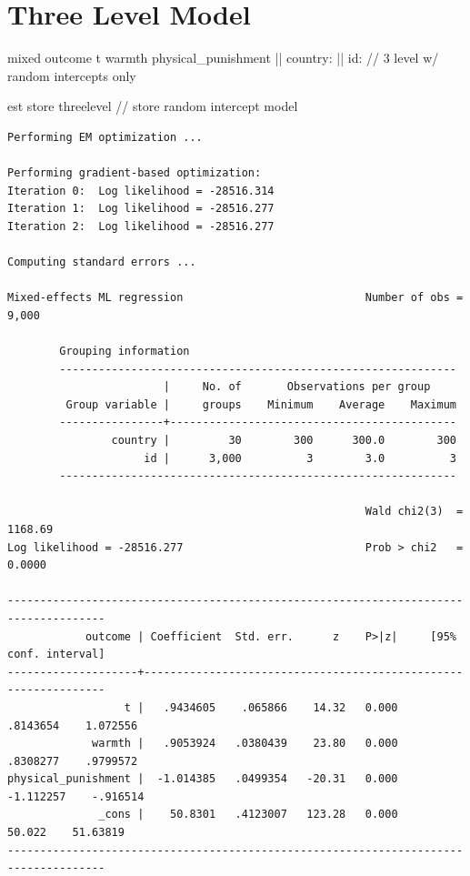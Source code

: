 \documentclass[
  letterpaper,
  DIV=11,
  numbers=noendperiod]{scrreprt}
\newenvironment{Shaded}{\begin{snugshade}}{\end{snugshade}}
\newcommand{\CommentTok}[1]{\textcolor[rgb]{0.37,0.37,0.37}{#1}}
\newcommand{\KeywordTok}[1]{\textcolor[rgb]{0.00,0.23,0.31}{#1}}
\newcommand{\NormalTok}[1]{\textcolor[rgb]{0.00,0.23,0.31}{#1}}
\begin{document}
\section{Three Level Model}\label{three-level-model}

\begin{Shaded}
\begin{Highlighting}[]

\NormalTok{mixed outcome t warmth physical\_punishment || country: || id:  }\CommentTok{// 3 level w/ random intercepts only}
    
\KeywordTok{est} \KeywordTok{store}\NormalTok{ threelevel }\CommentTok{// store random intercept model}
\end{Highlighting}
\end{Shaded}

\begin{verbatim}
Performing EM optimization ...

Performing gradient-based optimization: 
Iteration 0:  Log likelihood = -28516.314  
Iteration 1:  Log likelihood = -28516.277  
Iteration 2:  Log likelihood = -28516.277  

Computing standard errors ...

Mixed-effects ML regression                            Number of obs =   9,000

        Grouping information
        -------------------------------------------------------------
                        |     No. of       Observations per group
         Group variable |     groups    Minimum    Average    Maximum
        ----------------+--------------------------------------------
                country |         30        300      300.0        300
                     id |      3,000          3        3.0          3
        -------------------------------------------------------------

                                                       Wald chi2(3)  = 1168.69
Log likelihood = -28516.277                            Prob > chi2   =  0.0000

-------------------------------------------------------------------------------------
            outcome | Coefficient  Std. err.      z    P>|z|     [95% conf. interval]
--------------------+----------------------------------------------------------------
                  t |   .9434605    .065866    14.32   0.000     .8143654    1.072556
             warmth |   .9053924   .0380439    23.80   0.000     .8308277    .9799572
physical_punishment |  -1.014385   .0499354   -20.31   0.000    -1.112257    -.916514
              _cons |    50.8301   .4123007   123.28   0.000       50.022    51.63819
-------------------------------------------------------------------------------------


\end{verbatim}
\end{document}
